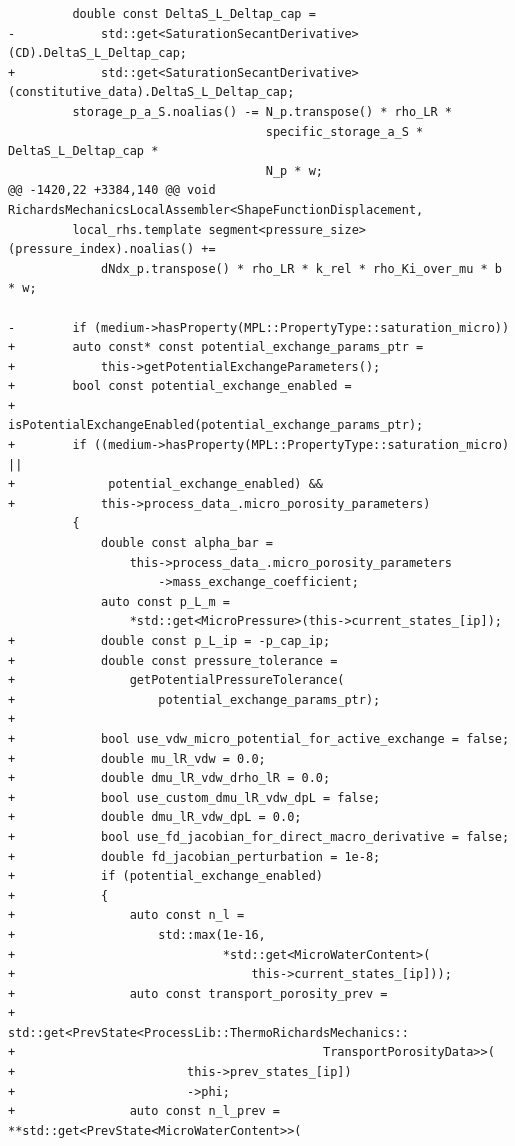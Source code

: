 \documentclass[10pt]{article}
\begin{document}
\begin{lstlisting}
         double const DeltaS_L_Deltap_cap =
-            std::get<SaturationSecantDerivative>(CD).DeltaS_L_Deltap_cap;
+            std::get<SaturationSecantDerivative>(constitutive_data).DeltaS_L_Deltap_cap;
         storage_p_a_S.noalias() -= N_p.transpose() * rho_LR *
                                    specific_storage_a_S * DeltaS_L_Deltap_cap *
                                    N_p * w;
@@ -1420,22 +3384,140 @@ void RichardsMechanicsLocalAssembler<ShapeFunctionDisplacement,
         local_rhs.template segment<pressure_size>(pressure_index).noalias() +=
             dNdx_p.transpose() * rho_LR * k_rel * rho_Ki_over_mu * b * w;
 
-        if (medium->hasProperty(MPL::PropertyType::saturation_micro))
+        auto const* const potential_exchange_params_ptr =
+            this->getPotentialExchangeParameters();
+        bool const potential_exchange_enabled =
+            isPotentialExchangeEnabled(potential_exchange_params_ptr);
+        if ((medium->hasProperty(MPL::PropertyType::saturation_micro) ||
+             potential_exchange_enabled) &&
+            this->process_data_.micro_porosity_parameters)
         {
             double const alpha_bar =
                 this->process_data_.micro_porosity_parameters
                     ->mass_exchange_coefficient;
             auto const p_L_m =
                 *std::get<MicroPressure>(this->current_states_[ip]);
+            double const p_L_ip = -p_cap_ip;
+            double const pressure_tolerance =
+                getPotentialPressureTolerance(
+                    potential_exchange_params_ptr);
+
+            bool use_vdw_micro_potential_for_active_exchange = false;
+            double mu_lR_vdw = 0.0;
+            double dmu_lR_vdw_drho_lR = 0.0;
+            bool use_custom_dmu_lR_vdw_dpL = false;
+            double dmu_lR_vdw_dpL = 0.0;
+            bool use_fd_jacobian_for_direct_macro_derivative = false;
+            double fd_jacobian_perturbation = 1e-8;
+            if (potential_exchange_enabled)
+            {
+                auto const n_l =
+                    std::max(1e-16,
+                             *std::get<MicroWaterContent>(
+                                 this->current_states_[ip]));
+                auto const transport_porosity_prev =
+                    std::get<PrevState<ProcessLib::ThermoRichardsMechanics::
+                                           TransportPorosityData>>(
+                        this->prev_states_[ip])
+                        ->phi;
+                auto const n_l_prev = **std::get<PrevState<MicroWaterContent>>(

\end{lstlisting}
\end{document}
